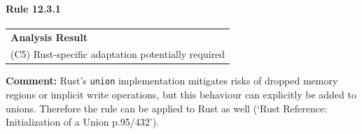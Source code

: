 \paragraph{Rule 12.3.1}
\begin{longtable}{p{13cm}}
\textbf{Analysis Result} \\
(C5) Rust-specific adaptation potentially required \\
\end{longtable}
\textbf{Comment:} Rust's \texttt{union} implementation mitigates risks of dropped memory regions or implicit write operations, but this behaviour can explicitly be added to unions. Therefore the rule can be applied to Rust as well (`Rust Reference: Initialization of a Union p.95/432'). \\
